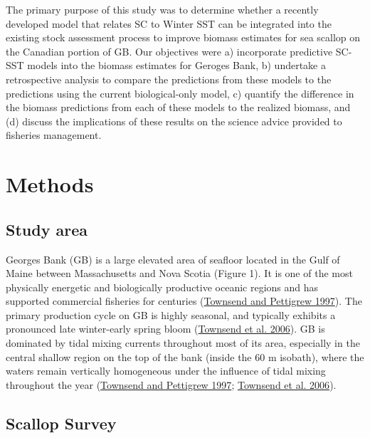 \documentclass[
]{article}
\begin{document}
The primary purpose of this study was to determine whether a recently developed model that relates SC to Winter SST can be integrated into the existing stock assessment process to improve biomass estimates for sea scallop on the Canadian portion of GB. Our objectives were a) incorporate predictive SC-SST models into the biomass estimates for Geroges Bank, b) undertake a retrospective analysis to compare the predictions from these models to the predictions using the current biological-only model, c) quantify the difference in the biomass predictions from each of these models to the realized biomass, and (d) discuss the implications of these results on the science advice provided to fisheries management.

\hypertarget{ref-methods}{%
\section{Methods}\label{ref-methods}}

\hypertarget{study-area}{%
\subsection{Study area}\label{study-area}}

Georges Bank (GB) is a large elevated area of seafloor located in the Gulf of Maine between Massachusetts and Nova Scotia (Figure 1). It is one of the most physically energetic and biologically productive oceanic regions and has supported commercial fisheries for centuries (\protect\hyperlink{ref-townsendNitrogenLimitationSecondary1997}{Townsend and Pettigrew 1997}). The primary production cycle on GB is highly seasonal, and typically exhibits a pronounced late winter-early spring bloom (\protect\hyperlink{ref-townsendOceanographyNorthwestAtlantic2006}{Townsend et al. 2006}). GB is dominated by tidal mixing currents throughout most of its area, especially in the central shallow region on the top of the bank (inside the 60 m isobath), where the waters remain vertically homogeneous under the influence of tidal mixing throughout the year (\protect\hyperlink{ref-townsendNitrogenLimitationSecondary1997}{Townsend and Pettigrew 1997}; \protect\hyperlink{ref-townsendOceanographyNorthwestAtlantic2006}{Townsend et al. 2006}).

\hypertarget{scallop-survey}{%
\subsection{Scallop Survey}\label{scallop-survey}}
\end{document}
